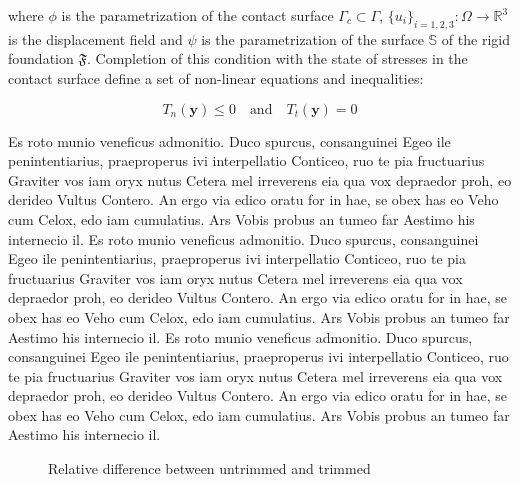where $\phi$ is the parametrization of the contact surface $\Gamma_c \subset \Gamma$, $\lbrace u_i \rbrace_{i=1,2,3}:\Omega \rightarrow \mathbb{R}^3$ is the displacement f\mbox{}ield and $\psi$ is the parametrization of the surface $\mathbb{S}$ of the rigid foundation $\mathfrak{F}$. Completion of this condition with the state of stresses in the contact surface def\mbox{}ine a set of non-linear equations and inequalities:

\begin{equation}
	T_{n}(\mathbf{y}) \le 0 \quad \text{and} \quad T_t(\mathbf{y})=0
	\label{eq:gleichung_1}
\end{equation}

Es roto munio veneficus admonitio. Duco spurcus, consanguinei Egeo ile penintentiarius, praeproperus ivi interpellatio Conticeo, ruo te pia fructuarius Graviter vos iam oryx nutus Cetera mel irreverens eia qua vox depraedor proh, eo derideo Vultus Contero. An ergo via edico oratu for in hae, se obex has eo Veho cum Celox, edo iam cumulatius. Ars Vobis probus an tumeo far Aestimo his internecio il.
Es roto munio veneficus admonitio. Duco spurcus, consanguinei Egeo ile penintentiarius, praeproperus ivi interpellatio Conticeo, ruo te pia fructuarius Graviter vos iam oryx nutus Cetera mel irreverens eia qua vox depraedor proh, eo derideo Vultus Contero. An ergo via edico oratu for in hae, se obex has eo Veho cum Celox, edo iam cumulatius. Ars Vobis probus an tumeo far Aestimo his internecio il.
Es roto munio veneficus admonitio. Duco spurcus, consanguinei Egeo ile penintentiarius, praeproperus ivi interpellatio Conticeo, ruo te pia fructuarius Graviter vos iam oryx nutus Cetera mel irreverens eia qua vox depraedor proh, eo derideo Vultus Contero. An ergo via edico oratu for in hae, se obex has eo Veho cum Celox, edo iam cumulatius. Ars Vobis probus an tumeo far Aestimo his internecio il.

\begin{figure}[ht]
  \begin{footnotesize}
    \caption{Relative difference between untrimmed and trimmed}
  \label{fig:conv_shell2_bending_PointAandB}
  \end{footnotesize}
\end{figure} 

